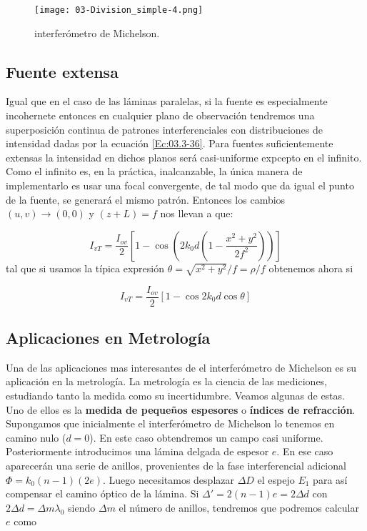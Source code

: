 \documentclass[12pt,a4paper]{book}
\numberwithin{equation}{section}
\numberwithin{figure}{section}
\newcommand{\parentesis}[1]{\left( #1  \right)}
\newcommand{\ccorchetes}[1]{\left[ #1  \right]}
\newcommand{\1}{_{(1)}}
\newcommand{\2}{_{(2)}}
\theoremstyle{definition}
\begin{document}
\begin{figure}[h!] \centering
\texttt{[image: 03-Division\_simple-4.png]}
\caption{interferómetro de Michelson.}
\label{Fig:03.3-02}
\end{figure}

\subsection{Fuente extensa}

Igual que en el caso de las láminas paralelas, si la fuente es especialmente incohernete entonces en cualquier plano de observación tendremos una superposición continua de patrones interferenciales con distribuciones de intensidad dadas por la ecuación \ref{Ec:03.3-36}. Para fuentes suficientemente extensas la intensidad en dichos planos será casi-uniforme expcepto en el infinito. Como el infinito es, en la práctica, inalcanzable, la única manera de implementarlo es usar una focal convergente, de tal modo que da igual el punto de la fuente, se generará el mismo patrón. Entonces los cambios $(u,v)\rightarrow(0,0)$ y $(z+L)=f$ nos llevan a que:

\begin{equation}
I_{vT}  = \frac{I_{ov}}{2} \ccorchetes{1-\cos \parentesis{2k_0 d \parentesis{1-\frac{x^2+y^2}{2f^2}}}}
\end{equation}
tal que si usamos la típica expresión $\theta=\sqrt{x^2+y^2}/f = \rho/f$ obtenemos ahora si


\begin{equation}
I_{vT}  = \frac{I_{ov}}{2} \ccorchetes{1-\cos  2k_0 d \cos \theta}
\end{equation}

\subsection{Aplicaciones en Metrología}

Una de las aplicaciones mas interesantes de el interferómetro de Michelson es su aplicación en la metrología. La metrología es la ciencia de las mediciones, estudiando tanto la medida como su incertidumbre. Veamos algunas de estas. \\

Uno de ellos es la \textbf{medida de pequeños espesores} o \textbf{índices de refracción}. Supongamos que inicialmente el interferómetro de Michelson lo tenemos en camino nulo ($d=0$). En este caso obtendremos un campo casi uniforme. Posteriormente introducimos una lámina delgada de espesor $e$. En ese caso aparecerán una serie de anillos, provenientes de la fase interferencial adicional $\Phi = k_0 (n-1)(2e)$. Luego necesitamos desplazar $\Delta D$ el espejo $E_1$ para así compensar el camino óptico de la lámina. Si $\Delta'=2(n-1)e=2\Delta d$ con $2\Delta d = \Delta m \lambda_0$ siendo $\Delta m$ el número de anillos, tendremos que podremos calcular $e$ como
\end{document}
